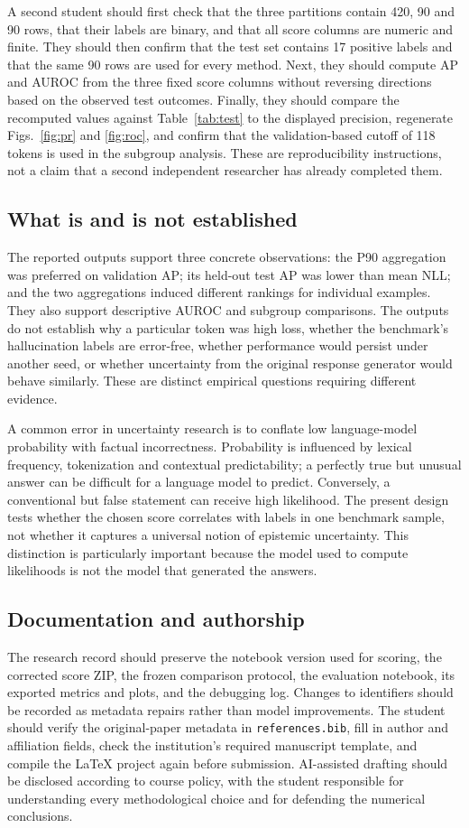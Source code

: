 \documentclass[manuscript,screen]{acmart}
\begin{document}
A second student should first check that the three partitions contain 420, 90 and 90 rows, that their labels are binary, and that all score columns are numeric and finite. They should then confirm that the test set contains 17 positive labels and that the same 90 rows are used for every method. Next, they should compute AP and AUROC from the three fixed score columns without reversing directions based on the observed test outcomes. Finally, they should compare the recomputed values against Table~\ref{tab:test} to the displayed precision, regenerate Figs.~\ref{fig:pr} and \ref{fig:roc}, and confirm that the validation-based cutoff of 118 tokens is used in the subgroup analysis. These are reproducibility instructions, not a claim that a second independent researcher has already completed them.

\subsection{What is and is not established}
The reported outputs support three concrete observations: the P90 aggregation was preferred on validation AP; its held-out test AP was lower than mean NLL; and the two aggregations induced different rankings for individual examples. They also support descriptive AUROC and subgroup comparisons. The outputs do not establish why a particular token was high loss, whether the benchmark's hallucination labels are error-free, whether performance would persist under another seed, or whether uncertainty from the original response generator would behave similarly. These are distinct empirical questions requiring different evidence.

A common error in uncertainty research is to conflate low language-model probability with factual incorrectness. Probability is influenced by lexical frequency, tokenization and contextual predictability; a perfectly true but unusual answer can be difficult for a language model to predict. Conversely, a conventional but false statement can receive high likelihood. The present design tests whether the chosen score correlates with labels in one benchmark sample, not whether it captures a universal notion of epistemic uncertainty. This distinction is particularly important because the model used to compute likelihoods is not the model that generated the answers.

\subsection{Documentation and authorship}
The research record should preserve the notebook version used for scoring, the corrected score ZIP, the frozen comparison protocol, the evaluation notebook, its exported metrics and plots, and the debugging log. Changes to identifiers should be recorded as metadata repairs rather than model improvements. The student should verify the original-paper metadata in \texttt{references.bib}, fill in author and affiliation fields, check the institution's required manuscript template, and compile the LaTeX project again before submission. AI-assisted drafting should be disclosed according to course policy, with the student responsible for understanding every methodological choice and for defending the numerical conclusions.
\end{document}
